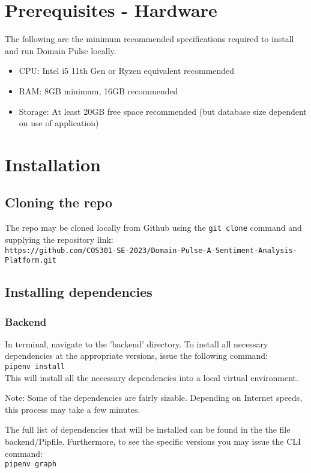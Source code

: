 \documentclass[12pt]{article}
\begin{document}
\section{Prerequisites - Hardware}
The following are the minimum recommended specifications required to install and run Domain Pulse locally.
\begin{itemize}
    \item CPU: Intel i5 11th Gen or Ryzen equivalent recommended
    \item RAM: 8GB minimum, 16GB recommended
    \item Storage: At least 20GB free space recommended (but database size dependent on use of application)
\end{itemize}


\section{Installation}

\subsection{Cloning the repo}
The repo may be cloned locally from Github using the \texttt{git clone} command and supplying the repository link:\\
\texttt{https://github.com/COS301-SE-2023/Domain-Pulse-A-Sentiment-Analysis-Platform.git}



\subsection{Installing dependencies}
\subsubsection{Backend}
In terminal, navigate to the 'backend' directory. To install all necessary dependencies at the appropriate versions, issue the following
command: \\
\texttt{pipenv install}\\
This will install all the necessary dependencies into a local virtual environment.

Note: Some of the dependencies are fairly sizable. Depending on Internet speeds, this process may take a few minutes.

The full list of dependencies that will be installed can be found in the the file backend/Pipfile. Furthermore, to see the specific versions you may issue the CLI command:\\
\texttt{pipenv graph} 
\end{document}
